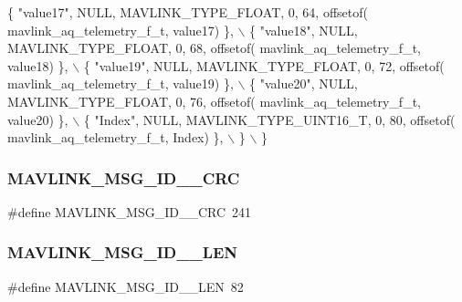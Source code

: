 \begin{DoxyCode}
         \{ \textcolor{stringliteral}{"value17"}, NULL, MAVLINK_TYPE_FLOAT, 0, 64, offsetof(
      mavlink_aq_telemetry_f_t, value17) \}, \(\backslash\)
         \{ \textcolor{stringliteral}{"value18"}, NULL, MAVLINK_TYPE_FLOAT, 0, 68, offsetof(
      mavlink_aq_telemetry_f_t, value18) \}, \(\backslash\)
         \{ \textcolor{stringliteral}{"value19"}, NULL, MAVLINK_TYPE_FLOAT, 0, 72, offsetof(
      mavlink_aq_telemetry_f_t, value19) \}, \(\backslash\)
         \{ \textcolor{stringliteral}{"value20"}, NULL, MAVLINK_TYPE_FLOAT, 0, 76, offsetof(
      mavlink_aq_telemetry_f_t, value20) \}, \(\backslash\)
         \{ \textcolor{stringliteral}{"Index"}, NULL, MAVLINK_TYPE_UINT16_T, 0, 80, offsetof(
      mavlink_aq_telemetry_f_t, Index) \}, \(\backslash\)
         \} \(\backslash\)
\}
\end{DoxyCode}
\mbox{\label{mavlink__msg__aq__telemetry__f_8h_ae81e3851bc0e0cc0378c5d152b305454}} 
\subsubsection{M\+A\+V\+L\+I\+N\+K\+\_\+\+M\+S\+G\+\_\+\+I\+D\+\_\+\_\+\+C\+RC}
{\footnotesize\ttfamily \#define M\+A\+V\+L\+I\+N\+K\+\_\+\+M\+S\+G\+\_\+\+I\+D\+\_\+\_\+\+C\+RC~241}

\mbox{\label{mavlink__msg__aq__telemetry__f_8h_a22c67230fa94f333c230625d1afdbd6b}} 
\subsubsection{M\+A\+V\+L\+I\+N\+K\+\_\+\+M\+S\+G\+\_\+\+I\+D\+\_\+\_\+\+L\+EN}
{\footnotesize\ttfamily \#define M\+A\+V\+L\+I\+N\+K\+\_\+\+M\+S\+G\+\_\+\+I\+D\+\_\+\_\+\+L\+EN~82}

